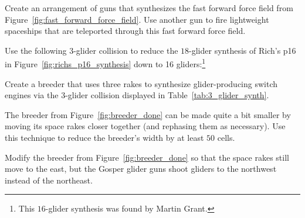 \begin{multicols}{2}
\mfilbreak


\begin{problem}\label{exer:synthesize_ffff}
	Create an arrangement of guns that synthesizes the fast forward force field from Figure~\ref{fig:fast_forward_force_field}. Use another gun to fire lightweight spaceships that are teleported through this fast forward force field.
\end{problem}


\mfilbreak


\begin{problem}\label{exer:rich_p16_16}
	Use the following $3$-glider collision to reduce the $18$-glider synthesis of Rich's p16 in Figure~\ref{fig:richs_p16_synthesis} down to 16 gliders:\footnote{This $16$-glider synthesis was found by Martin Grant.}
	\begin{center}
	\end{center}
\end{problem}


\mfilbreak


\begin{problem}\label{exer:glider_producing_switch_breeder}
	Create a breeder that uses three rakes to synthesize glider-producing switch engines via the $3$-glider collision displayed in Table~\ref{tab:3_glider_synth}.
	
\end{problem}


\mfilbreak



\begin{problem}\label{exer:breeder_minimize}
	The breeder from Figure~\ref{fig:breeder_done} can be made quite a bit smaller by moving its space rakes closer together (and rephasing them as necessary). Use this technique to reduce the breeder's width by at least $50$ cells.
\end{problem}


\mfilbreak


\begin{problem}\label{exer:breeder_done_northwest}
	Modify the breeder from Figure~\ref{fig:breeder_done} so that the space rakes still move to the east, but the Gosper glider guns shoot gliders to the northwest instead of the northeast.
\end{problem}



\end{multicols}
